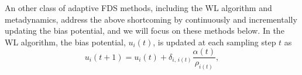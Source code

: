 \documentclass[reprint, superscriptaddress, floatfix]{revtex4-1}
\begin{document}
An other class of adaptive FDS methods,
including the WL algorithm\cite{wang2001, *wang2001pre}
and metadynamics\cite{huber1994, laio2002, *laio2008, *barducci2011, *sutto2012},
address the above shortcoming
by continuously and incrementally updating the bias potential,
and we will focus on these methods below.
%
%
%
%
%
%
In the WL algorithm\cite{wang2001, *wang2001pre},
the bias potential, $u_i(t)$, is updated
at each sampling step $t$ as
%
\begin{equation}
  u_i(t+1)
  =
  u_i(t)
  +
  \delta_{i, \, i(t)}
  \frac{ \alpha(t) } { \rho_{i(t)} }
  ,
\label{eq:wl_update}
\end{equation}
\end{document}
